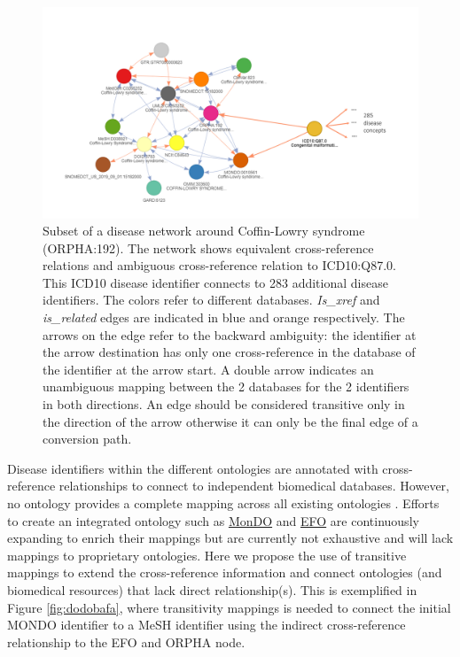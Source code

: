 \documentclass[9pt,a4paper,]{extarticle}
\begin{document}
\begin{figure}

{\centering \includegraphics[width=1\linewidth]{fig/Figure4} 

}

\caption{Subset of a disease network around Coffin-Lowry syndrome (ORPHA:192). The network shows equivalent cross-reference relations and ambiguous cross-reference relation to ICD10:Q87.0. This ICD10 disease identifier connects to 283 additional disease identifiers. The colors refer to different databases. \emph{Is\_xref} and \emph{is\_related} edges are indicated in blue and orange respectively. The arrows on the edge refer to the backward ambiguity: the identifier at the arrow destination has only one cross-reference in the database of the identifier at the arrow start. A double arrow indicates an unambiguous mapping between the 2 databases for the 2 identifiers in both directions. An edge should be considered transitive only in the direction of the arrow otherwise it can only be the final edge of a conversion path.}\label{fig:ICD10q87}
\end{figure}

Disease identifiers within the different ontologies are annotated with cross-reference relationships to connect to independent biomedical databases. However, no ontology provides a complete mapping across all existing ontologies \citep{Hu2017, Rappaport2013}. Efforts to create an integrated ontology such as \href{https://mondo.monarchinitiative.org/}{MonDO} and \href{http://blog.opentargets.org/2019/12/19/efo3-a-community-driven-ontology-to-advance-clinical-discoveries/}{EFO} are continuously expanding to enrich their mappings but are currently not exhaustive and will lack mappings to proprietary ontologies. Here we propose the use of transitive mappings to extend the cross-reference information and connect ontologies (and biomedical resources) that lack direct relationship(s). This is exemplified in Figure \ref{fig:dodobafa}, where transitivity mappings is needed to connect the initial MONDO identifier to a MeSH identifier using the indirect cross-reference relationship to the EFO and ORPHA node.
\end{document}
